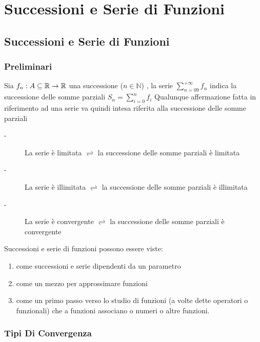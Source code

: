 \part{Successioni e Serie di Funzioni}
\chapter{Successioni e Serie di Funzioni}
\section{Preliminari}
Sia $f_n:A\subseteq \mathbb{R}\to \mathbb{R}$ una successione ($n\in\mathbb{N}$) , la serie $\sum\limits_{n=09}^{+\infty}f_n$ indica la successione delle somme parziali $S_n = \sum\limits_{i=0}^nf_i$
\observation
Qualunque affermazione fatta in riferimento ad una serie va quindi intesa riferita alla successione delle somme parziali
\begin{description}
	\item[-] La serie è limitata $\rightleftharpoons$ la successione delle somme parziali è limitata
	\item[-] La serie è illimitata $\rightleftharpoons$ la successione delle somme parziali è illimitata
	\item[-] La serie è convergente $\rightleftharpoons$ la successione delle somme parziali è convergente
\end{description}
\observation
Successioni e serie di funzioni possono essere viste:
\begin{enumerate}
	\item come successioni e serie dipendenti da un parametro
	\item come un mezzo per approssimare funzioni
	\item come un primo passo verso lo studio di funzioni (a volte dette operatori o funzionali) che a funzioni associano o numeri o altre funzioni. 
\end{enumerate}
\section{Tipi Di Convergenza}
